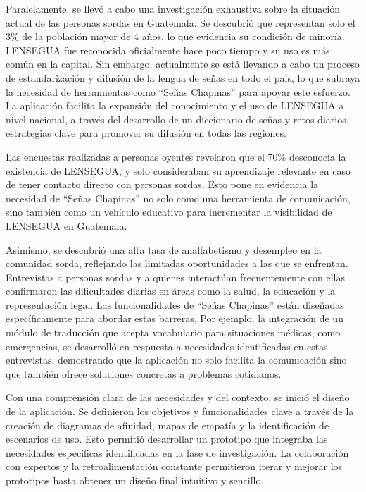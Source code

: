 Paralelamente, se llevó a cabo una investigación exhaustiva sobre la situación actual de las personas sordas en Guatemala. Se descubrió que representan solo el 3\% de la población mayor de 4 años, lo que evidencia su condición de minoría. LENSEGUA fue reconocida oficialmente hace poco tiempo y su uso es más común en la capital. Sin embargo, actualmente se está llevando a cabo un proceso de estandarización y difusión de la lengua de señas en todo el país, lo que subraya la necesidad de herramientas como ``Señas Chapinas'' para apoyar este esfuerzo. La aplicación facilita la expansión del conocimiento y el uso de LENSEGUA a nivel nacional, a través del desarrollo de un diccionario de señas y retos diarios, estrategias clave para promover su difusión en todas las regiones.

Las encuestas realizadas a personas oyentes revelaron que el 70\% desconocía la existencia de LENSEGUA, y solo consideraban su aprendizaje relevante en caso de tener contacto directo con personas sordas. Esto pone en evidencia la necesidad de ``Señas Chapinas'' no solo como una herramienta de comunicación, sino también como un vehículo educativo para incrementar la visibilidad de LENSEGUA en Guatemala.

Asimismo, se descubrió una alta tasa de analfabetismo y desempleo en la comunidad sorda, reflejando las limitadas oportunidades a las que se enfrentan. Entrevistas a personas sordas y a quienes interactúan frecuentemente con ellas confirmaron las dificultades diarias en áreas como la salud, la educación y la representación legal. Las funcionalidades de ``Señas Chapinas'' están diseñadas específicamente para abordar estas barreras. Por ejemplo, la integración de un módulo de traducción que acepta vocabulario para situaciones médicas, como emergencias, se desarrolló en respuesta a necesidades identificadas en estas entrevistas, demostrando que la aplicación no solo facilita la comunicación sino que también ofrece soluciones concretas a problemas cotidianos.

Con una comprensión clara de las necesidades y del contexto, se inició el diseño de la aplicación. Se definieron los objetivos y funcionalidades clave a través de la creación de diagramas de afinidad, mapas de empatía y la identificación de escenarios de uso. Esto permitió desarrollar un prototipo que integraba las necesidades específicas identificadas en la fase de investigación. La colaboración con expertos y la retroalimentación constante permitieron iterar y mejorar los prototipos hasta obtener un diseño final intuitivo y sencillo.

